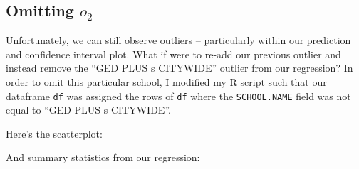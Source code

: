 \documentclass[11pt]{article} %
\begin{document}


\subsection*{Omitting $o_2$}
Unfortunately, we can still observe outliers -- particularly within our prediction and confidence interval plot. What if were to re-add our previous outlier and instead remove the ``GED PLUS s CITYWIDE'' outlier from our regression? In order to omit this particular school, I modified my \textsc{R} script such that our dataframe \texttt{df} was assigned the rows of \texttt{df} where the \texttt{SCHOOL.NAME} field was not equal to ``GED PLUS s CITYWIDE''. \par
Here's the scatterplot:


And summary statistics from our regression:
\end{document}

